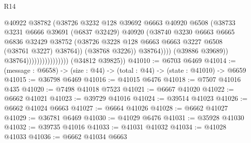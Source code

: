 \begin{lexlean}{R14}
\begin{coremodule}
                                              @40922
                                              @38782
                                              (@38726
                                                @3232
                                                @128
                                                @39692
                                                @6663
                                                @40920
                                                @6508
                                                (@38733
                                                  @3231
                                                  @6666
                                                  @39691
                                                  (@6837 @32429)
                                                  @40920
                                                  (@38740
                                                    @3230
                                                    @6663
                                                    @6665
                                                    @6836
                                                    @32429
                                                    @38752
                                                    (@38726
                                                      @3228
                                                      @128
                                                      @6663
                                                      @6663
                                                      @3227
                                                      @6508
                                                      (@38761 @3227)
                                                      @38764))
                                                  (@38768 @3226))
                                                @38764))))
                                        (@39886 @39689))
                                      @38764))))))))))))))))
      (@34812 @39825))
@41010 := @6703 @6469
@41014 := (message : @6658) -> (size : @44) -> (total : @44) -> (state : @41010) -> @6659
@41015 := @36798 @6469
@41016 := @41015 @6476
@41018 := @7507 @41016 @435
@41020 := @7498 @41018 @7523
@41021 := @6667 @41020
@41022 := @6662 @41021
@41023 := @39729 @41016
@41024 := @39514 @41023
@41026 := @6662 @41024 @6663
@41027 := @6664 @41026
@41028 := @6662 @41027
@41029 := @36781 @6469
@41030 := @41029 @6476
@41031 := @35928 @41030
@41032 := @39735 @41016
@41033 := @41031 @41032
@41034 := @41028 @41033
@41036 := @6662 @41034 @6663

\end{coremodule}
\end{lexlean}
